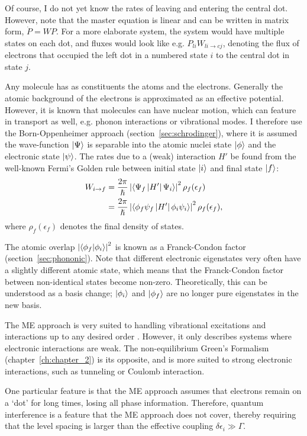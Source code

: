Of course, I do not yet know the rates of leaving and entering the central dot. However, note that the master equation is linear and can be written in matrix form, $\dot{P} = W P$. For a more elaborate system, the system would have multiple states on each dot, and fluxes would look like e.g. $P_{li} W_{li\rightarrow cj}$, denoting the flux of electrons that occupied the left dot in a numbered state $i$ to the central dot in state $j$.  

Any molecule has as constituents the atoms and the electrons. Generally the atomic background of the electrons is approximated as an effective potential. However, it is known that molecules can have nuclear motion, which can feature in transport as well, e.g. phonon interactions or vibrational modes. I therefore use the Born-Oppenheimer approach (section~\ref{sec:schrodinger}), where it is assumed the wave-function $\ket{\Psi}$ is separable into the atomic nuclei state $\ket{\phi}$ and the electronic state $\ket{\psi}$. The rates due to a (weak) interaction $H'$ be found from the well-known Fermi's Golden rule between initial state $\ket{i}$ and final state $\ket{f}$:
\begin{align*}
W_{i\rightarrow f}  &= \frac{2\pi}{\hslash} \left| \braket{\Psi_f \left|H'\right| \Psi_i}\right|^2 \rho_f (\epsilon_f)  \\
&= \frac{2\pi}{\hslash} \left| \braket{\phi_f \psi_f \left|H'\right| \phi_i \psi_i}\right|^2 \rho_f (\epsilon_f),
\end{align*}
where $\rho_f(\epsilon_f)$ denotes the final density of states. 

The atomic overlap $\left| \braket{ \phi_f | \phi_i }\right|^2$ is known as a Franck-Condon factor (section~\ref{sec:phononic}). Note that different electronic eigenstates very often have a slightly different atomic state, which means that the Franck-Condon factor between non-identical states become non-zero. Theoretically, this can be understood as a basis change; $\ket{\phi_i}$ and $\ket{\phi_f}$ are no longer pure eigenstates in the new basis. 

The ME approach is very suited to handling vibrational excitations and interactions up to any desired order \cite{seldenthuis}. However, it only describes systems where electronic interactions are weak. The non-equilibrium Green's Formalism (chapter~\ref{ch:chapter_2}) is its opposite, and is more suited to strong electronic interactions, such as tunneling or Coulomb interaction. 

One particular feature is that the ME approach assumes that electrons remain on a `dot' for long times, losing all phase information. Therefore, quantum interference is a feature that the ME approach does not cover, thereby requiring that the level spacing is larger than the effective coupling $\delta \epsilon_i \gg \Gamma$.

